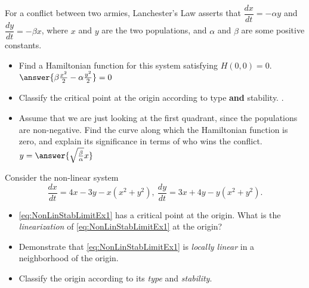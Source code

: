 \documentclass{ximera}
\begin{document}
\begin{exercise}
    For a conflict between two armies, Lanchester's Law asserts that $\dfrac{dx}{dt}=-\alpha y$ and $\dfrac{dy}{dt}=-\beta x$, %
    where $x$ and $y$ are the two populations, and $\alpha$ and $\beta$ are some positive constants.
    
    \begin{itemize}
        \item Find a Hamiltonian function for this system satisfying $H(0,0)=0$. $\answer{\beta\frac{x^2}{2} - \alpha \frac{y^2}{2}} = 0$
        \item Classify the critical point at the origin according to type {\bf and} stability. .
        \item Assume that we are just looking at the first quadrant, since the populations are non-negative. Find the curve along which the Hamiltonian function is zero, and explain its significance in terms of who wins the conflict.\\
        $y = \answer{\sqrt{\frac{\beta}{\alpha}}x}$
    \end{itemize}
\end{exercise}

\begin{exercise}
    Consider the non-linear system
    \begin{equation}
        \frac{dx}{dt}=4x-3y-x(x^2+y^2), \ \frac{dy}{dt}=3x+4y-y(x^2+y^2). \label{eq:NonLinStabLimitEx1} %
    \end{equation}
    \begin{itemize}
        \item \eqref{eq:NonLinStabLimitEx1} has a critical point at the origin. What is the {\it linearization} of \eqref{eq:NonLinStabLimitEx1} at the origin?\\
             
        \item Demonstrate that \eqref{eq:NonLinStabLimitEx1} is {\it locally linear} in a neighborhood of the origin. 
        \item Classify the origin according to its {\it type} and {\it stability}.\\
              
    \end{itemize}
\end{exercise}
\end{document}
